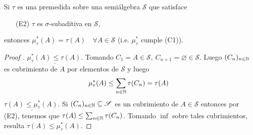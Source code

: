 \begin{prop}
	Si $\tau$ es una premedida sobre una semiálgebra $\mathscr{S}$ que satisface
	\begin{enumerate}
		\item[(E2)] $\tau$ es $\sigma$-subaditiva en $\mathscr{S}$,
	\end{enumerate}
	entonces $\mu_{\tau}^{*}(A) = \tau(A)\quad \forall A \in \mathscr{S}$ (i.e. $\mu_{\tau}^{*}$ cumple (C1)).
\end{prop}
\begin{proof}[Proof ]
	$\underline{\mu_{\tau}^{*}(A) \leq \tau(A).}$ Tomando $C_1 = A \in \mathscr{S},\ C_{n+1} = \varnothing \in \mathscr{S}$. Luego $(C_n)_{n\in\mathbb{N}}$ es cubrimiento de $A$ por elementos de $\mathscr{S}$ y luego
	\[ \mu_{\tau}^{*}(A) \leq \sum_{n\in\mathbb{N}} \tau(C_n) = \tau(A) \]
	$\underline{\tau(A) \leq \mu_{\tau}^{*}(A).}$ Si $(C_n)_{n\in\mathbb{N}}\subseteq \mathscr{S}$ es un cubrimiento de $A \in \mathscr{S}$ entonces por (E2), tenemos que $\tau(A) \leq \sum_{n\in\mathbb{N}} \tau(C_n)$. Tomando $\inf$ sobre tales cubrimientos, resulta $\tau(A) \leq \mu_{\tau}^{*}(A)$.
\end{proof}

